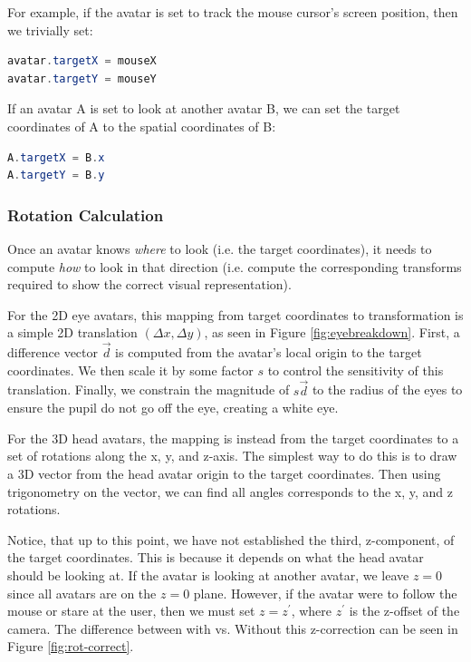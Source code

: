 For example, if the avatar is set to track the mouse cursor’s screen position, then we trivially set:

\begin{lstlisting}[language=Java]
avatar.targetX = mouseX
avatar.targetY = mouseY
\end{lstlisting}


If an avatar A is set to look at another avatar B, we can set the target coordinates of A to the spatial coordinates of B:

\begin{lstlisting}[language=Java]
A.targetX = B.x
A.targetY = B.y
\end{lstlisting}

\subsubsection{Rotation Calculation}

Once an avatar knows \textit{where} to look (i.e. the target coordinates),
it needs to compute \textit{how} to look in that direction (i.e. compute the corresponding transforms required to show the correct visual representation).


For the 2D eye avatars, this mapping from target coordinates to transformation is a simple 2D translation $(\Delta x, \Delta y)$, as seen in Figure \ref{fig:eyebreakdown}. First, a difference vector $\vec d$ is computed from the avatar’s local origin to the target coordinates. We then scale it by some factor $s$ to control the sensitivity of this translation. Finally, we constrain the magnitude of $s\vec d$ to the radius of the eyes to ensure the pupil do not go off the eye, creating a white eye.

For the 3D head avatars, the mapping is instead from the target coordinates to a set of rotations along the x, y, and z-axis. The simplest way to do this is to draw a 3D vector from the head avatar origin to the target coordinates. Then using trigonometry on the vector, we can find all angles corresponds to the x, y, and z rotations.

Notice, that up to this point, we have not established the third, z-component, of the target coordinates. This is because it depends on what the head avatar should be looking at. If the avatar is looking at another avatar, we leave $z = 0$ since all avatars are on the $z = 0$ plane. However, if the avatar were to follow the mouse or stare at the user, then we must set $z = z^\prime$, where $z^\prime$ is the z-offset of the camera. The difference between with vs. Without this z-correction can be seen in Figure \ref{fig:rot-correct}.

